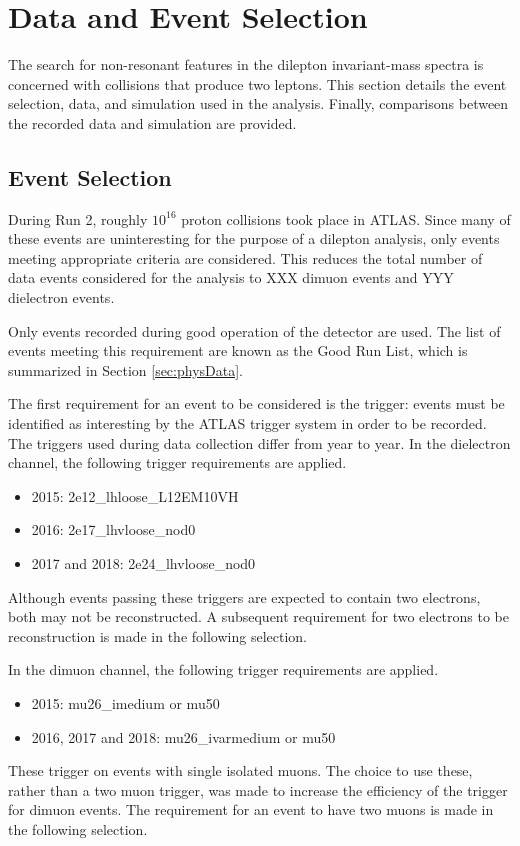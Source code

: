 \section{Data and Event Selection}\label{sec:ciEvSel}

The search for non-resonant features in the dilepton invariant-mass spectra is concerned with collisions that produce two leptons.
This section details the event selection, data, and simulation used in the analysis.
Finally, comparisons between the recorded data and simulation are provided.


\subsection{Event Selection}
During Run 2, roughly $10^{16}$ proton collisions took place in ATLAS. \check
Since many of these events are uninteresting for the purpose of a dilepton analysis, only events meeting appropriate criteria are considered.
This reduces the total number of data events considered for the analysis to {\color{red}XXX} dimuon events and {\color{red}YYY} dielectron events.

Only events recorded during good operation of the detector are used.
The list of events meeting this requirement are known as the Good Run List, which is summarized in Section \ref{sec:physData}.

The first requirement for an event to be considered is the trigger: events must be identified as interesting by the ATLAS trigger system in order to be recorded.
The triggers used during data collection differ from year to year. 
In the dielectron channel, the following trigger requirements are applied.
\begin{itemize}
	\item 2015: 2e12\_lhloose\_L12EM10VH
	\item 2016: 2e17\_lhvloose\_nod0
	\item 2017 and 2018: 2e24\_lhvloose\_nod0
\end{itemize}
Although events passing these triggers are expected to contain two electrons, both may not be reconstructed. 
A subsequent requirement for two electrons to be reconstruction is made in the following selection.

In the dimuon channel, the following trigger requirements are applied.
\begin{itemize}
	\item 2015: mu26\_imedium or mu50
	\item 2016, 2017 and 2018: mu26\_ivarmedium or mu50
\end{itemize}
These trigger on events with single isolated muons. 
The choice to use these, rather than a two muon trigger, was made to increase the efficiency of the trigger for dimuon events.
The requirement for an event to have two muons is made in the following selection.

